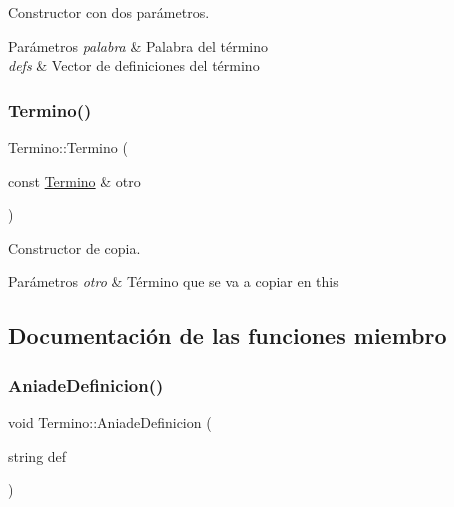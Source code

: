 Constructor con dos parámetros. 


\begin{DoxyParams}{Parámetros}
{\em palabra} & Palabra del término \\
\hline
{\em defs} & Vector de definiciones del término \\
\hline
\end{DoxyParams}
\mbox{\label{classTermino_a5614ae8912f6aabd677762cc6d10f2c8}} 
\subsubsection{\texorpdfstring{Termino()}{Termino()}\hspace{0.1cm}{\footnotesize\ttfamily [2/2]}}
{\footnotesize\ttfamily Termino\+::\+Termino (\begin{DoxyParamCaption}\item[{const \hyperlink{classTermino}{Termino} \&}]{otro }\end{DoxyParamCaption})}



Constructor de copia. 


\begin{DoxyParams}{Parámetros}
{\em otro} & Término que se va a copiar en this \\
\hline
\end{DoxyParams}


\subsection{Documentación de las funciones miembro}
\mbox{\label{classTermino_a93fed012290bc28881288cfd095c8500}} 
\subsubsection{\texorpdfstring{Aniade\+Definicion()}{AniadeDefinicion()}}
{\footnotesize\ttfamily void Termino\+::\+Aniade\+Definicion (\begin{DoxyParamCaption}\item[{string}]{def }\end{DoxyParamCaption})}



